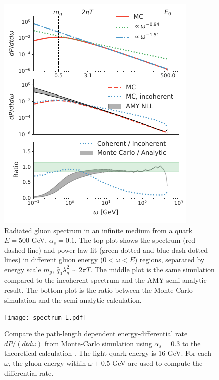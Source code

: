 \documentclass[aps, prc, reprint, amsmath, groupedaddress, nofootinbib]{revtex4-1}
\begin{document}
\begin{figure}
\includegraphics[width=\columnwidth]{spectrum.pdf}
\caption{Radiated gluon spectrum in an infinite medium from a quark $E=500$ GeV, $\alpha_s = 0.1$. The top plot shows the spectrum (red-dashed line) and power law fit (green-dotted and blue-dash-dotted lines) in different gluon energy ($0<\omega < E$) regions, separated by energy scale $m_g$, $\hat{q}_0\lambda_g^2 \sim 2\pi T$. The middle plot is the same simulation compared to the incoherent spectrum and the AMY semi-analytic result. The bottom plot is the ratio between the Monte-Carlo simulation and the semi-analytic calculation.}
\label{fig:spectrum}
\end{figure}

\begin{figure}
\texttt{[image: spectrum\_L.pdf]}
\caption{Compare the path-length dependent energy-differential rate $dP/(dtd\omega)$ from Monte-Carlo simulation using $\alpha_s = 0.3$ to the theoretical calculation \cite{CaronHuot:2008uh}. The light quark energy is $16$ GeV. For each $\omega$, the gluon energy within $\omega \pm 0.5$ GeV are used to compute the differential rate.}
\label{fig:spectra-L-alphas=0.3}
\end{figure}
\end{document}
